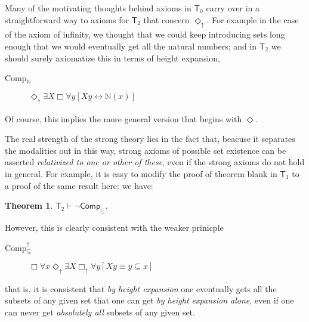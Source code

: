 \documentclass{article}
\newcommand{\du}{\Diamond_\uparrow}
\newcommand{\bu}{\Box_\uparrow}
\newtheorem{theorem}{Theorem}
\begin{document}
Many of the motivating thoughts behind axioms in $\mathsf{T}_0$
carry over in a straightforward way to axioms for $\mathsf{T}_2$ that concern $\du$.
For example in the case of the axiom of infinity, we thought that we could keep introducing 
sets long enough that we would eventually get all the natural numbers; and in $\mathsf{T}_2$ we 
should surely axiomatize this in terms of height expansion,

\begin{description}
    \item[Comp$_\mathbb{N}$]
    $\du \exists X \Box \forall y[ Xy \leftrightarrow \mathbb{N}(x)]$
\end{description}
Of course, this implies the more general version that begins with $\Diamond$.

The real strength of the strong theory 
lies in the fact that, beacuse it separates the modalities out in this way, 
strong axioms of possible set existence can be asserted \emph{relativized to one 
or other of these}, even if the strong axioms do not hold in general. For example, 
it is easy to modify the proof of theorem blank in $\mathsf{T}_1$ to a proof of the same result here:
we have:
\begin{theorem}
    $\mathsf{T}_2 \vdash \neg \mathsf{Comp}_\subseteq$.
\end{theorem}
However, this is clearly consistent with the weaker prinicple
\begin{description}
    \item[Comp$_\subseteq^\uparrow$] $\Box \forall x \du \exists X \bu \forall y[Xy \equiv y \subseteq x]$
\end{description}
that is, it is consistent that \emph{by height expansion} one eventually gets all the subsets 
of any given set that one can get \emph{by height expansion alone}, even if one can never get 
\emph{absolutely all} subsets of any given set.
\end{document}
